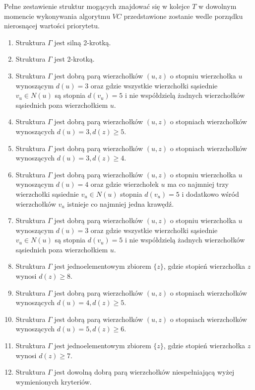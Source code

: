 {  Pełne zestawienie struktur mogących znajdować się w kolejce $T$ w dowolnym momencie wykonywania algorytmu $VC$ przedstawione zostanie wedle porządku nierosnącej wartości priorytetu.
  \begin{enumerate}[(1)]
    \item Struktura $\Gamma$ jest silną 2-krotką.
    \item Struktura $\Gamma$ jest 2-krotką.
    \item Struktura $\Gamma$ jest dobrą parą wierzchołków $(u, z)$ o stopniu wierzchołka $u$ wynoszącym $d(u)=3$ oraz gdzie wszystkie wierzchołki sąsiednie $v_u \in N(u)$ są stopnia $d(v_u)=5$ i nie współdzielą żadnych wierzchołków sąsiednich poza wierzchołkiem $u$.
    \item Struktura $\Gamma$ jest dobrą parą wierzchołków $(u, z)$ o stopniach wierzchołków wynoszących $d(u)=3, d(z) \geq 5$.
    \item Struktura $\Gamma$ jest dobrą parą wierzchołków $(u, z)$ o stopniach wierzchołków wynoszących $d(u)=3, d(z) \geq 4$.
    \item Struktura $\Gamma$ jest dobrą parą wierzchołków $(u, z)$ o stopniu wierzchołka $u$ wynoszącym $d(u)=4$ oraz gdzie wierzchołek $u$ ma co najmniej trzy wierzchołki sąsiednie $v_u \in N(u)$ stopnia $d(v_u)=5$ i dodatkowo wśród wierzchołków $v_u$ istnieje co najmniej jedna krawędź.
    \item Struktura $\Gamma$ jest dobrą parą wierzchołków $(u, z)$ o stopniu wierzchołka $u$ wynoszącym $d(u)=3$ oraz gdzie wszystkie wierzchołki sąsiednie $v_u \in N(u)$ są stopnia $d(v_u)=5$ i nie współdzielą żadnych wierzchołków sąsiednich poza wierzchołkiem $u$.
    \item Struktura $\Gamma$ jest jednoelementowym zbiorem $\{z\}$, gdzie stopień wierzchołka $z$ wynosi $d(z) \geq 8$.
    \item Struktura $\Gamma$ jest dobrą parą wierzchołków $(u, z)$ o stopniach wierzchołków wynoszących $d(u)=4, d(z) \geq 5$.
    \item Struktura $\Gamma$ jest dobrą parą wierzchołków $(u, z)$ o stopniach wierzchołków wynoszących $d(u)=5, d(z) \geq 6$.
    \item Struktura $\Gamma$ jest jednoelementowym zbiorem $\{z\}$, gdzie stopień wierzchołka $z$ wynosi $d(z) \geq 7$.
    \item Struktura $\Gamma$ jest dowolną dobrą parą wierzchołków niespełniającą wyżej wymienionych kryteriów.
  \end{enumerate}

}
